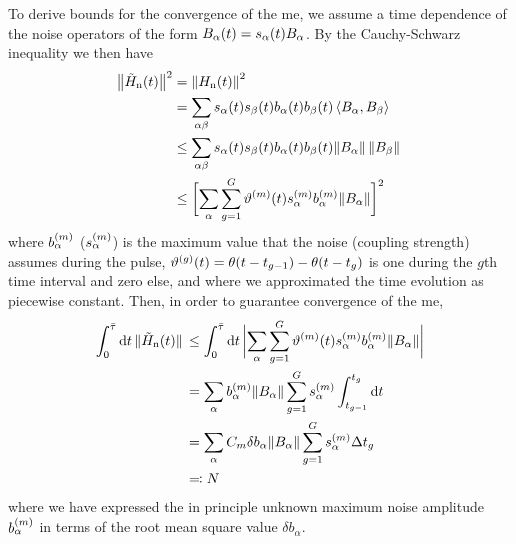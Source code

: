 To derive bounds for the convergence of the \gls{me}, we assume a time dependence of the noise operators of the form $B_\alpha(t) = s_\alpha(t)B_\alpha$.
By the Cauchy-Schwarz inequality we then have
\begin{equation}
    \begin{split}
        \bigl\lVert\tilde{H}_{\mathrm{n}}(t)\bigr\rVert^2 &= \norm{H_{\mathrm{n}}(t)}^2 \\
                                        &= \sum_{\alpha\beta} s_\alpha(t) s_{\beta}(t) b_\alpha(t) b_{\beta}(t)\expval{B_\alpha,B_{\beta}} \\
                                        &\leq\sum_{\alpha\beta} s_\alpha(t) s_{\beta}(t) b_\alpha(t) b_{\beta}(t)
                                           \norm*{B_\alpha}\norm*{B_{\beta}} \\
                                        &\leq\biggl[\sum_{\alpha}\sum_{g=1}^{G}\vartheta^{(m)}(t)
                                           s_\alpha^{(m)} b_\alpha^{(m)}\norm{B_\alpha}\biggr]^2
    \end{split}
\end{equation}
where $b_{\alpha}^{(m)}$ ($s_{\alpha}^{(m)}$) is the maximum value that the noise (coupling strength) assumes during the pulse, $\vartheta^{(g)}(t) = \theta(t - t_{g-1}) - \theta(t - t_g)$ is one during the $g$th time interval and zero else, and where we approximated the time evolution as piecewise constant.
Then, in order to guarantee convergence of the \gls{me},
\begin{equation}
    \begin{split}
        \int_0^{\bar{\tau}}\dd{t}\norm*{\Hnt(t)} &\leq\int_0^{\bar{\tau}}\dd{t}\abs\bigg{\sum_{\alpha}\sum_{g=1}^{G}
                                                    \vartheta\gth{m}(t) s_\alpha\gth{m} b_\alpha\gth{m}\norm{B_\alpha}} \\
                                                 &= \sum_{\alpha} b_\alpha\gth{m}\norm{B_\alpha}\sum_{g=1}^{G}s_\alpha\gth{m}
                                                    \int_{t_{g-1}}^{t_{g}}\dd{t} \\
                                                 &= \sum_{\alpha} C_m\delta b_\alpha\norm{B_\alpha}\sum_{g=1}^{G}
                                                    s_\alpha\gth{m}\Delta t_g \\
                                                 &\eqqcolon N
    \end{split}
\end{equation}
where we have expressed the in principle unknown maximum noise amplitude $b_\alpha^{(m)}$ in terms of the root mean square value $\delta b_\alpha$.
